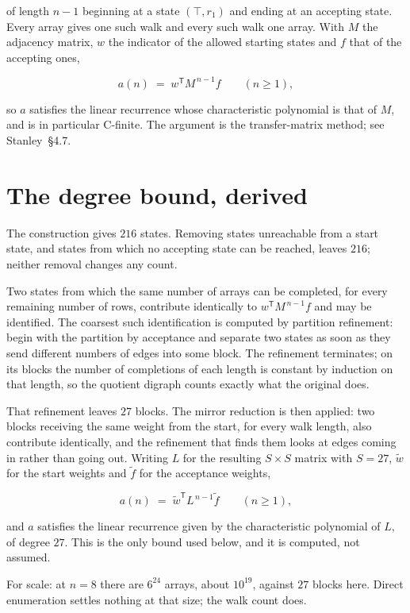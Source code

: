 \documentclass[11pt]{article}
\theoremstyle{definition}
\begin{document}
of length $n-1$ beginning at a state $(\top,r_1)$ and ending at an accepting state. Every array gives one such walk and every such walk one array. With $M$ the adjacency matrix, $w$ the indicator of the allowed starting states and $f$ that of the accepting ones,

\[a(n) \;=\; w^{\mathsf T} M^{\,n-1} f \qquad (n \ge 1),\]

so $a$ satisfies the linear recurrence whose characteristic polynomial is that of $M$, and is in particular C-finite. The argument is the transfer-matrix method; see Stanley~\S4.7.

\section{The degree bound, derived}

The construction gives $216$ states. Removing states unreachable from a start state, and states from which no accepting state can be reached, leaves $216$; neither removal changes any count.

Two states from which the same number of arrays can be completed, for every remaining number of rows, contribute identically to $w^{\mathsf T}M^{\,n-1}f$ and may be identified. The coarsest such identification is computed by partition refinement: begin with the partition by acceptance and separate two states as soon as they send different numbers of edges into some block. The refinement terminates; on its blocks the number of completions of each length is constant by induction on that length, so the quotient digraph counts exactly what the original does.

That refinement leaves $27$ blocks. The mirror reduction is then applied: two blocks receiving the same weight from the start, for every walk length, also contribute identically, and the refinement that finds them looks at edges coming in rather than going out. Writing $L$ for the resulting $S \times S$ matrix with $S = 27$, $\tilde w$ for the start weights and $\tilde f$ for the acceptance weights,

\[a(n) \;=\; \tilde w^{\mathsf T} L^{\,n-1} \tilde f \qquad (n \ge 1),\]

and $a$ satisfies the linear recurrence given by the characteristic polynomial of $L$, of degree $27$. This is the only bound used below, and it is computed, not assumed.

For scale: at $n = 8$ there are $6^{24}$ arrays, about $10^{19}$, against $27$ blocks here. Direct enumeration settles nothing at that size; the walk count does.
\end{document}
